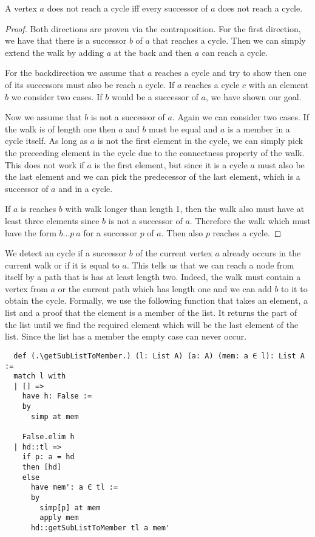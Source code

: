 \begin{lemma}[\NotreachesCycleIffSuccessorsNotReachCycle]
  A vertex $a$ does not reach a cycle iff every successor of $a$ does not reach a cycle.
\end{lemma}
\begin{proof}
  Both directions are proven via the contraposition. For the first direction, we have that there is a successor $b$ of $a$ that reaches a cycle. Then we can simply extend the walk by adding $a$ at the back and then $a$ can reach a cycle.

  For the backdirection we assume that $a$ reaches a cycle and try to show then one of its successors must also be reach a cycle. 
  If $a$ reaches a cycle $c$ with an element $b$ we consider two cases. 
  If $b$ would be a successor of $a$, we have shown our goal.
  
  Now we assume that $b$ is not a successor of $a$. Again we can consider two cases. If the walk is of length one then $a$ and $b$ must be equal and $a$ is a member in a cycle itself. As long as $a$ is not the first element in the cycle, we can simply pick the preceeding element in the cycle due to the connectness property of the walk. This does not work if $a$ is the first element, but since it is a cycle $a$ must also be the last element and we can pick the predecessor of the last element, which is a successor of $a$ and in a cycle.

  If $a$ is reaches $b$ with walk longer than length 1, then the walk also must have at least three elements since $b$ is not a successor of $a$. Therefore the walk which must have the form $b \dots p\ a$ for a successor $p$ of $a$. Then also $p$ reaches a cycle.
\end{proof}

We detect an cycle if a successor $b$ of the current vertex $a$ already occurs in the current walk or if it is equal to $a$. This tells us that we can reach a node from itself by a path that is has at least length two. Indeed, the walk must contain a vertex from $a$ or the current path which has length one and we can add $b$ to it to obtain the cycle. Formally, we use the following function that takes an element, a list and a proof that the element is a member of the list. It returns the part of the list until we find the required element which will be the last element of the list. Since the list has a member the empty case can never occur.

\begin{lstlisting}
  def (.\getSubListToMember.) (l: List A) (a: A) (mem: a ∈ l): List A :=
  match l with
  | [] =>
    have h: False :=
    by
      simp at mem

    False.elim h
  | hd::tl =>
    if p: a = hd
    then [hd]
    else
      have mem': a ∈ tl :=
      by
        simp[p] at mem
        apply mem
      hd::getSubListToMember tl a mem'
\end{lstlisting}

